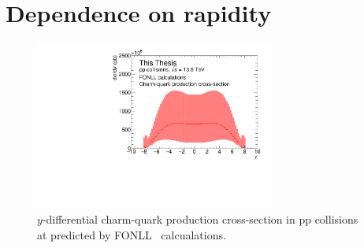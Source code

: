 \section{Dependence on rapidity}
\begin{figure} 
    \centering
    \includegraphics[width=0.7\textwidth]{Figures/Chapter 7/FONLLVsY.pdf}
    \caption{$y$-differential charm-quark production cross-section in  pp collisions at \thirteen predicted by FONLL~\cite{Cacciari:1998it} calcualations.}
    \label{fig:FONLLVsY}
\end{figure}
